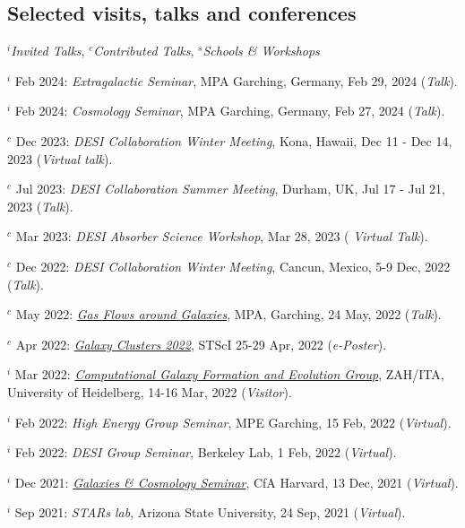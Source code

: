 \documentclass[12pt,letterpaper]{article}
\begin{document}
\subsection{Selected visits, talks and conferences}
$^i$\emph{Invited Talks}, $^c$\emph{Contributed Talks}, $^s$\emph{Schools \& Workshops}
\begin{list}{}{\cvlist}
\item $^i$ Feb 2024:  \emph{Extragalactic Seminar}, MPA Garching, Germany, Feb 29, 2024 (\textit{Talk}).
\item $^i$ Feb 2024:  \emph{Cosmology Seminar}, MPA Garching, Germany, Feb 27, 2024 (\textit{Talk}).
\item $^c$ Dec 2023:  \emph{DESI Collaboration Winter Meeting}, Kona, Hawaii, Dec 11 - Dec 14, 2023 (\textit{Virtual talk}).
\item $^c$ Jul 2023:  \emph{DESI Collaboration Summer Meeting}, Durham, UK, Jul 17 - Jul 21, 2023 (\textit{Talk}). 
\item $^c$ Mar 2023:  \emph{DESI Absorber Science Workshop}, Mar 28, 2023 (\textit{ Virtual Talk}).   
\item $^c$ Dec 2022:  \emph{DESI Collaboration Winter Meeting}, Cancun, Mexico, 5-9 Dec, 2022 (\textit{Talk}).   
\item $^c$ May 2022:  \emph{\href{https://indico.ph.tum.de/event/7018/}{Gas Flows around Galaxies}}, MPA, Garching, 24 May, 2022 (\textit{Talk}).   
\item $^c$ Apr 2022:  \emph{\href{https://www.stsci.edu/contents/events/stsci/2022/april/galaxy-clusters-2022-challenging-our-cosmological-perspectives}{Galaxy Clusters 2022}}, STScI 25-29 Apr, 2022 (\textit{e-Poster}).   
\item $^i$ Mar 2022:  \emph{\href{https://zah.uni-heidelberg.de/research-groups\#c2659}{Computational Galaxy Formation and Evolution Group}}, ZAH/ITA, University of Heidelberg, 14-16 Mar, 2022 (\textit{Visitor}).   
\item $^i$ Feb 2022:  \emph{High Energy Group Seminar}, MPE Garching, 15 Feb, 2022 (\textit{Virtual}).   
\item $^i$ Feb 2022:  \emph{DESI Group Seminar}, Berkeley Lab, 1 Feb, 2022 (\textit{Virtual}).   
\item $^i$ Dec 2021:  \emph{\href{https://pweb.cfa.harvard.edu/calendar/event/9298}{Galaxies \& Cosmology Seminar}}, CfA Harvard, 13 Dec, 2021 (\textit{Virtual}).   
\item $^i$ Sep 2021:  \textit{STARs lab}, Arizona State University, 24 Sep, 2021 (\textit{Virtual}).   


\end{list}
\end{document}
